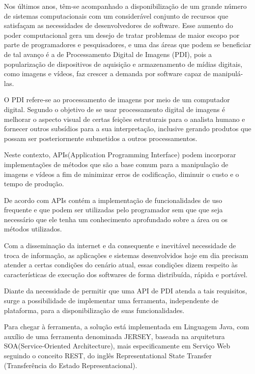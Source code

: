 \documentclass[12pt]{article}
\begin{document}
Nos últimos anos, têm-se acompanhado a disponibilização de um grande número de sistemas 
computacionais com um considerável conjunto de recursos que satisfaçam as necessidades de 
desenvolvedores de software. Esse aumento do poder computacional gera um desejo de tratar 
problemas de maior escopo por parte de programadores e pesquisadores, e uma das áreas que podem 
se beneficiar de tal avanço é a de Processamento Digital de Imagens (PDI), pois a popularização 
de dispositivos de aquisição e armazenamento de mídias digitais, como imagens e vídeos, faz 
crescer a demanda por software capaz de manipulá-las.

O PDI refere-se ao processamento de imagens por meio de um computador digital. Segundo \cite{spring} o objetivo de se usar processamento digital de imagens é melhorar o aspecto visual de certas feições estruturais para o analista humano e fornecer outros subsídios para a sua interpretação, inclusive gerando produtos que possam ser posteriormente submetidos a outros processamentos. 

Neste contexto, APIs(Application Programming Interface) podem incorporar implementações de métodos que são a base comum para a manipulação de imagens e 
vídeos a fim de minimizar erros de codificação, diminuir o custo e o tempo de produção. 

De acordo com \cite{pressman:16, sommerville:11} APIs contém a implementação de funcionalidades de uso frequente e que podem ser utilizadas pelo
programador sem que que seja necessário que ele tenha um conhecimento aprofundado sobre a área ou os métodos utilizados.

Com a disseminação da internet e da consequente e inevitável necessidade de troca de informação, 
as aplicações e sistemas desenvolvidos hoje em dia precisam 
atender a certas condições do cenário atual, essas condições dizem respeito às características 
de execução dos softwares de forma distribuída, rápida e portável. 

Diante da necessidade de permitir que uma API de PDI atenda a tais requisitos, surge a
possibilidade de implementar uma ferramenta, independente de plataforma, para a
disponibilização de suas funcionalidades.

Para chegar à ferramenta, a solução está implementada em Linguagem
Java, com auxílio de uma ferramenta denominada JERSEY, baseada na arquitetura
SOA(Service-Oriented Architecture), mais especificamente em Serviço Web seguindo o conceito REST, do inglês
Representational State Transfer (Transferência do Estado Representacional). 
\end{document}
